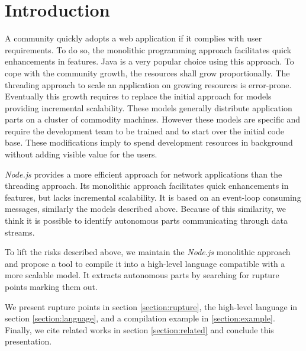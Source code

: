 \section{Introduction}

A community quickly adopts a web application if it complies with user requirements.
To do so, the monolithic programming approach facilitates quick enhancements in features.
Java is a very popular choice using this approach.
To cope with the community growth, the resources shall grow proportionally.
The threading approach to scale an application on growing resources is error-prone.
Eventually this growth requires to replace the initial approach for models providing incremental scalability.
These models generally distribute application parts on a cluster of commodity machines\cite{Fox1997}.
However these models are specific and require the development team to be trained and to start over the initial code base.
These modifications imply to spend development resources in background without adding visible value for the users.

\textit{Node.js} provides a more efficient approach for network applications than the threading approach.
Its monolithic approach facilitates quick enhancements in features, but lacks incremental scalability.
It is based on an event-loop consuming messages, similarly the models described above.
Because of this similarity, we think it is possible to identify autonomous parts communicating through data streams.

To lift the risks described above, we maintain the \textit{Node.js} monolithic approach and propose a tool to compile it into a high-level language compatible with a more scalable model.
It extracts autonomous parts by searching for rupture points marking them out.

We present rupture points in section \ref{section:rupture}, the high-level language in section \ref{section:language}, and a compilation example in \ref{section:example}.
Finally, we cite related works in section \ref{section:related} and conclude this presentation.